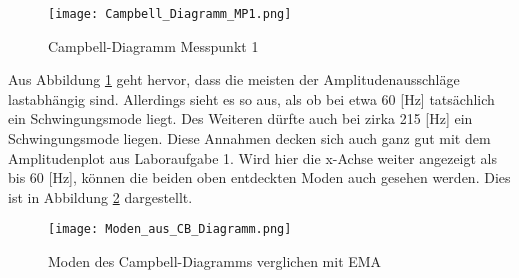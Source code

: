     \begin{figure}[H]
        \centering
        \texttt{[image: Campbell\_Diagramm\_MP1.png]}
        \caption{Campbell-Diagramm Messpunkt 1}
        \label{fig: Campbell_Diagramm}
    \end{figure}

    \noindent
    Aus Abbildung \ref{fig: Campbell_Diagramm} geht hervor, dass die meisten der
    Amplitudenausschläge lastabhängig sind. Allerdings sieht es so aus, als ob bei
    etwa 60 [Hz] tatsächlich ein Schwingungsmode liegt. Des Weiteren dürfte auch
    bei zirka 215 [Hz] ein Schwingungsmode liegen. Diese Annahmen decken sich
    auch ganz gut mit dem Amplitudenplot aus Laboraufgabe 1. Wird hier die
    x-Achse weiter angezeigt als bis 60 [Hz], können die beiden oben entdeckten
    Moden auch gesehen werden. Dies ist in Abbildung
    \ref{fig: Modevergleich_CB_EMA} dargestellt.

    \begin{figure}[H]
        \centering
        \texttt{[image: Moden\_aus\_CB\_Diagramm.png]}
        \caption{Moden des Campbell-Diagramms verglichen mit EMA}
        \label{fig: Modevergleich_CB_EMA}
    \end{figure}


